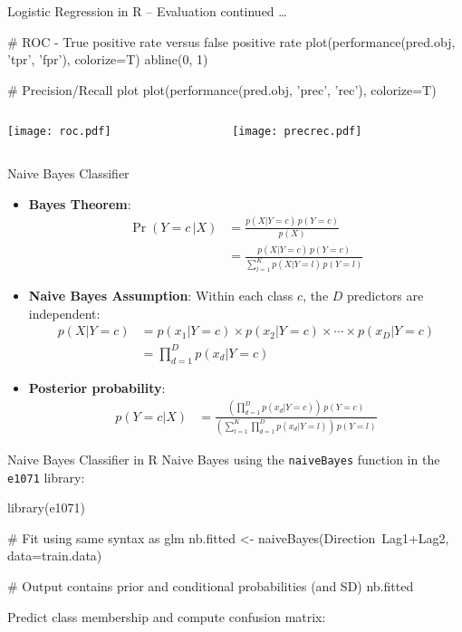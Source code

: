 \documentclass[ignorenonframetext,xcolor=x11names]{beamer}
\begin{document}
\begin{frame}[fragile]{Logistic Regression in R -- Evaluation}
\small
continued \ldots
\begin{Rcode}
# ROC - True positive rate versus false positive rate
plot(performance(pred.obj, 'tpr', 'fpr'), colorize=T)
abline(0, 1)

# Precision/Recall plot
plot(performance(pred.obj, 'prec', 'rec'), colorize=T)
\end{Rcode}

\begin{columns}
\begin{column}{.4\textwidth}
\texttt{[image: roc.pdf]}
\end{column}
\begin{column}{.4\textwidth}
\texttt{[image: precrec.pdf]}
\end{column}
\end{columns}
\end{frame}


\begin{frame}{Naive Bayes Classifier}
\small \vspace{-3mm}
\begin{itemize}
\item \textbf{Bayes Theorem}:
\begin{align*}
\Pr(Y=c\, | X) &= \frac{p(X|Y=c)\, p(Y=c)}{p(X)} \\
&= \frac{p(X|Y=c)\,p(Y=c) }{\sum_{l=1}^K p(X|Y=l)\,p(Y=l)} 
\end{align*}
\item \textbf{Naive Bayes Assumption}: Within each class $c$, the $D$ predictors are independent:
\begin{align*}
p(X | Y=c ) &= p(x_1 | Y=c) \times p(x_2 | Y=c) \times \cdots  \times p(x_D | Y=c) \\
            &= \prod_{d=1}^D p(x_d | Y=c)
\end{align*}
\item \textbf{Posterior probability}:
\begin{align*}
p(Y=c|X) &= \frac{\left(\prod_{d=1}^D p(x_d | Y=c)\right) \, p(Y=c)}{\left(\sum_{l=1}^K \prod_{d=1}^D p(x_d | Y=l)\right) \, p(Y=l) } 
\end{align*}
\end{itemize}
\end{frame}


\begin{frame}[fragile]{Naive Bayes Classifier in R}
\small
Naive Bayes using the \texttt{naiveBayes} function in the \texttt{e1071} library:
\begin{Rcode}
library(e1071)

# Fit using same syntax as glm
nb.fitted <- naiveBayes(Direction~Lag1+Lag2, data=train.data)

# Output contains prior and conditional probabilities (and SD)
nb.fitted
\end{Rcode}
Predict class membership and compute confusion matrix:
\end{frame}
\end{document}
